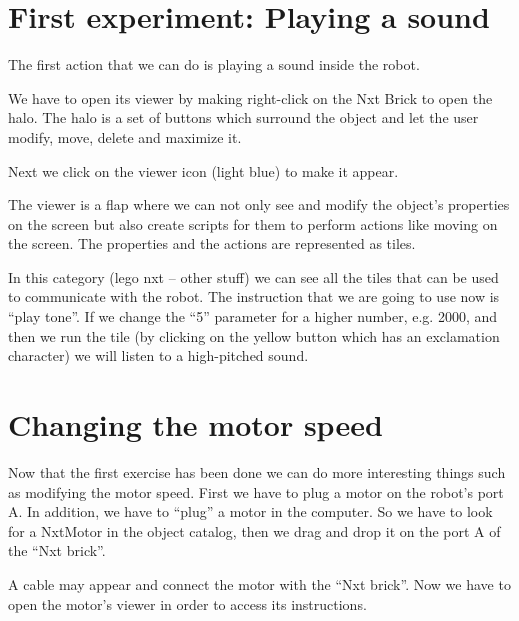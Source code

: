 \documentclass[english]{etoys-guide}
\begin{document}


\section{First experiment: Playing a sound}

The first action that we can do is playing a sound inside the robot. 

We have to open its viewer by making right-click on the Nxt Brick to open the
halo. The halo is a set of buttons which surround the object and let the user
modify, move, delete and maximize it.


Next we click on the viewer icon (light blue) to make it appear. 



The viewer is a flap where we can not only see and modify the object’s
properties on the screen but also create scripts for them to perform actions
like moving on the screen. The properties and the actions are represented as
tiles.


In this category (lego nxt – other stuff) we can see all the tiles that can be
used to communicate with the robot. The instruction that we are going to use
now is “play tone”. If we change the “5” parameter for a higher number, e.g.
2000, and then we run the tile (by clicking on the yellow button which has an
exclamation character) we will listen to a high-pitched sound. 

\section{Changing the motor speed}

Now that the first exercise has been done we can do more interesting things
such as modifying the motor speed.  First we have to plug a motor on the
robot’s port A. In addition, we have to “plug” a motor in the computer. So we
have to look for a NxtMotor in the object catalog, then we drag and drop it on
the port A of the “Nxt brick”.




A cable may appear and connect the motor with the “Nxt brick”. Now we have to
open the motor’s viewer in order to access its instructions.





\end{document}
